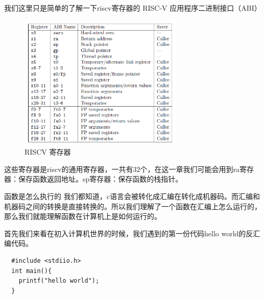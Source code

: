 \documentclass[lang=cn,10pt]{elegantbook}
\begin{document}
我们这里只是简单的了解一下riscv寄存器的 RISC-V 应用程序二进制接口（ABI）

\begin{figure}[htbp]
  \centering
  \includegraphics[width=0.7\textwidth]{image/regfile.png}
  \caption{RISCV 寄存器}
\end{figure}

这些寄存器是riscv的通用寄存器，一共有32个，在这一章我们可能会用到ra寄存器：保存函数返回地址。sp寄存器：保存函数的栈指针。

函数是怎么执行的
我们都知道，c语言会被转化成汇编在转化成机器码。而汇编和机器码之间的转换是直接转换的。所以我们理解了一个函数在汇编上怎么运行的，那么我们就能理解函数在计算机上是如何运行的。



首先我们来看在初入计算机世界的时候，我们遇到的第一份代码hello world的反汇编代码。

\begin{lstlisting}
  #include <stdiio.h>
  int main(){
    printf("hello world");
  }
\end{lstlisting}
\end{document}
